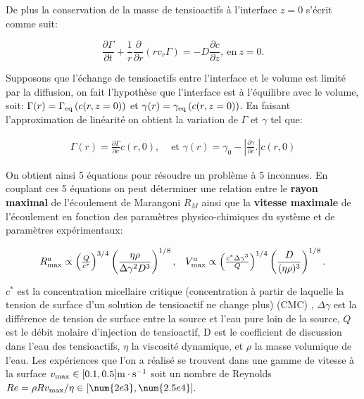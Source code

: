 \documentclass[french, 10pt]{article}
\begin{document}
De plus la conservation de la masse de tensioactifs à l'interface $z=0$ s'écrit comme suit: 

\begin{equation}
  \frac{\partial \Gamma}{\partial t}+\frac{1}{r}\frac{\partial }{\partial r}\left(r v_r \Gamma\right) = -D\frac{\partial c}{\partial z},~\text{en}~z=0.\label{eq:conservationdelamassedesurfactant}
\end{equation}



Supposons que l'échange de tensioactifs entre l'interface et le volume est limité par la diffusion, on fait l'hypothèse que l'interface est à l'équilibre avec le volume, soit: $\Gamma(r)=\Gamma_{\rm eq}\left(c(r,z=0)\right)$ et $\gamma(r)=\gamma_{\rm eq}\left(c(r,z=0)\right)$. En faisant l'approximation de linéarité on obtient la variation de $\Gamma$ et $\gamma$ tel que:

\begin{equation}
    \begin{array}{cc}
      \Gamma(r)=\frac{\partial \Gamma}{\partial c}c(r,0), & \text{ et } \gamma(r)=\gamma_0-\left|\frac{\partial \gamma}{\partial c}.\right|c(r,0)\label{eq:gradientconcentration}
   \end{array}
\end{equation}

On obtient ainsi 5 équations pour résoudre un problème à 5 inconnues. En couplant ces 5 équations on peut déterminer une relation entre le \textbf{rayon maximal} de l'écoulement de Marangoni $R_M$ ainsi que la \textbf{vitesse maximale} de l'écoulement en fonction des paramètres physico-chimiques du système et de paramètres expérimentaux:
% 

\begin{equation}
  \begin{array}{cc}

  R_{\rm max}^{a} \propto \left(\frac{Q}{c^{*}}\right)^{3/4}\left(\dfrac{\eta\rho}{\Delta\gamma^2 D^3}\right)^{1/8}, & V_{\rm max}^{a}\propto\left(\frac{c^{*}\Delta\gamma^3}{Q}\right)^{1/4}\left(\dfrac{D}{(\eta\rho)^3}\right)^{1/8}.\label{eq:rmarangoni}
      
\end{array}
\end{equation}

$c^*$ est la concentration micellaire critique (concentration à partir de laquelle la tension de surface d'un solution de tensioactif ne change plus)  (CMC) , $\Delta\gamma$ est la différence de tension de surface entre la source et l'eau pure loin de la source, $Q$ est le débit molaire d'injection de tensioactif, D est le coefficient de discussion dans l'eau des tensioactifs, $\eta$ la viscosité dynamique, et $\rho$ la masse volumique de l'eau. Les expériences que l'on a réalisé se trouvent dans une gamme de vitesse à la surface $v_{\rm max} \in [0.1, 0.5] \rm m\cdot s^{-1}$ soit un nombre de Reynolds $Re=\rho R v_{\rm max}/\eta \in [\num{2e3},\num{2.5e4}].$\medskip
\end{document}
